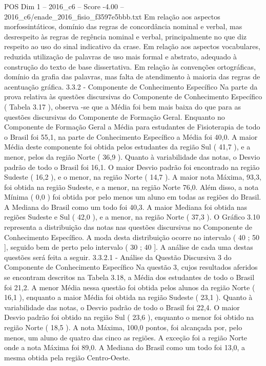 \begin{textsample}{POS Dim 1 – 2016\_c6 – Score -4.00 – 2016\_c6/enade\_2016\_fisio\_f3597e5bbb.txt}
Em relação aos aspectos morfossintáticos, domínio das regras de concordância nominal e verbal, mas desrespeito às regras de regência nominal e verbal, principalmente no que diz respeito ao uso do sinal indicativo da crase.
Em relação aos aspectos vocabulares, reduzida utilização de palavras de uso mais formal e abstrato, adequado à construção do texto de base dissertativa.
Em relação às convenções ortográficas, domínio da grafia das palavras, mas falta de atendimento à maioria das regras de acentuação gráfica. 3.3.2 - Componente de Conhecimento Específico Na parte da prova relativa às questões discursivas do Componente de Conhecimento Específico ( Tabela 3.17 ), observa -se que a Média foi bem mais baixa do que para as questões discursivas do Componente de Formação Geral.
Enquanto no Componente de Formação Geral a Média para estudantes de Fisioterapia de todo o Brasil foi 55,1, na parte de Conhecimento Específico a Média foi 40,0.
A maior Média deste componente foi obtida pelos estudantes da região Sul ( 41,7 ), e a menor, pelos da região Norte ( 36,9 ).
Quanto à variabilidade das notas, o Desvio padrão de todo o Brasil foi 16,1.
O maior Desvio padrão foi encontrado na região Sudeste ( 16,2 ), e o menor, na região Norte ( 14,7 ).
A maior nota Máxima, 93,3, foi obtida na região Sudeste, e a menor, na região Norte 76,0.
Além disso, a nota Mínima ( 0,0 ) foi obtida por pelo menos um aluno em todas as regiões do Brasil.
A Mediana do Brasil como um todo foi 40,3.
A maior Mediana foi obtida nas regiões Sudeste e Sul ( 42,0 ), e a menor, na região Norte ( 37,3 ).
O Gráfico 3.10 representa a distribuição das notas nas questões discursivas no Componente de Conhecimento Específico.
A moda desta distribuição ocorre no intervalo ( 40 ; 50 ], seguido bem de perto pelo intervalo ( 30 ; 40 ].
A análise de cada uma destas questões será feita a seguir. 3.3.2.1 - Análise da Questão Discursiva 3 do Componente de Conhecimento Específico Na questão 3, cujos resultados aferidos se encontram descritos na Tabela 3.18, a Média dos estudantes de todo o Brasil foi 21,2.
A menor Média nessa questão foi obtida pelos alunos da região Norte ( 16,1 ), enquanto a maior Média foi obtida na região Sudeste ( 23,1 ).
Quanto à variabilidade das notas, o Desvio padrão de todo o Brasil foi 22,4.
O maior Desvio padrão foi obtido na região Sul ( 23,6 ), enquanto o menor foi obtido na região Norte ( 18,5 ).
A nota Máxima, 100,0 pontos, foi alcançada por, pelo menos, um aluno de quatro das cinco as regiões.
A exceção foi a região Norte onde a nota Máxima foi 89,0.
A Mediana do Brasil como um todo foi 13,0, a mesma obtida pela região Centro-Oeste.

\end{textsample}

